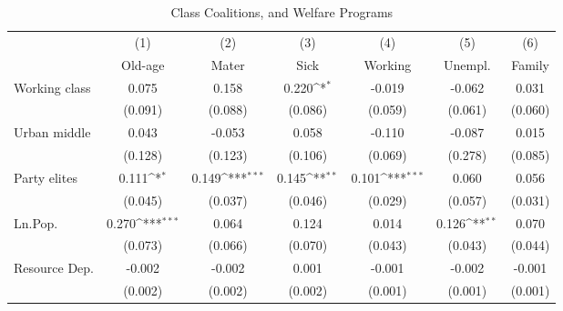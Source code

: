 \documentclass[11pt]{article}
\begin{document}
	
\begin{table}[htbp]\centering
\def\sym#1{\ifmmode^{#1}\else\(^{#1}\)\fi}
\caption{Class Coalitions, and Welfare Programs}
\begin{tabular}{l*{6}{c}}
\hline\hline
                    &\multicolumn{1}{c}{(1)}         &\multicolumn{1}{c}{(2)}         &\multicolumn{1}{c}{(3)}         &\multicolumn{1}{c}{(4)}         &\multicolumn{1}{c}{(5)}         &\multicolumn{1}{c}{(6)}         \\
                    &     Old-age         &       Mater         &        Sick         &     Working         &     Unempl.         &      Family         \\
\hline
Working class       &       0.075         &       0.158         &       0.220\sym{*}  &      -0.019         &      -0.062         &       0.031         \\
                    &     (0.091)         &     (0.088)         &     (0.086)         &     (0.059)         &     (0.061)         &     (0.060)         \\
[1em]
Urban middle        &       0.043         &      -0.053         &       0.058         &      -0.110         &      -0.087         &       0.015         \\
                    &     (0.128)         &     (0.123)         &     (0.106)         &     (0.069)         &     (0.278)         &     (0.085)         \\
[1em]
Party elites        &       0.111\sym{*}  &       0.149\sym{***}&       0.145\sym{**} &       0.101\sym{***}&       0.060         &       0.056         \\
                    &     (0.045)         &     (0.037)         &     (0.046)         &     (0.029)         &     (0.057)         &     (0.031)         \\
[1em]
Ln.Pop.             &       0.270\sym{***}&       0.064         &       0.124         &       0.014         &       0.126\sym{**} &       0.070         \\
                    &     (0.073)         &     (0.066)         &     (0.070)         &     (0.043)         &     (0.043)         &     (0.044)         \\
[1em]
Resource Dep.       &      -0.002         &      -0.002         &       0.001         &      -0.001         &      -0.002         &      -0.001         \\
                    &     (0.002)         &     (0.002)         &     (0.002)         &     (0.001)         &     (0.001)         &     (0.001)         \\

\end{tabular}
\end{table}
\end{document}
